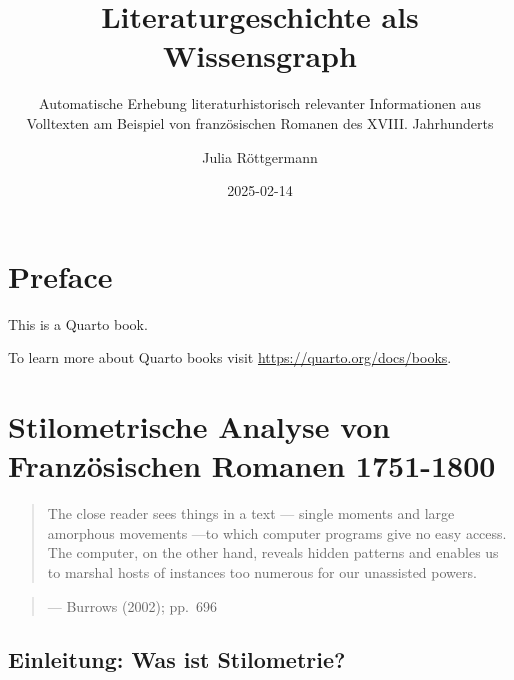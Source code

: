 \documentclass[
  12pt,
  letterpaper,
]{classicthesis}
\title{Literaturgeschichte als Wissensgraph}
\subtitle{Automatische Erhebung literaturhistorisch relevanter
Informationen aus Volltexten am Beispiel von französischen Romanen des
XVIII. Jahrhunderts}
\author{Julia Röttgermann}
\date{2025-02-14}
\renewcommand*\contentsname{Table of contents}
\newcommand\contentsname{Table of contents}
\begin{document}
\maketitle

\renewcommand*\contentsname{Table of contents}
{
\hypersetup{linkcolor=}
\setcounter{tocdepth}{2}
\tableofcontents
}


\chapter*{Preface}\label{preface}


This is a Quarto book.

To learn more about Quarto books visit
\url{https://quarto.org/docs/books}.


\chapter{\texorpdfstring{\textbf{Stilometrische Analyse von
Französischen Romanen
1751-1800}}{Stilometrische Analyse von Französischen Romanen 1751-1800}}\label{stilometrische-analyse-von-franzuxf6sischen-romanen-1751-1800}

\begin{quote}
The close reader sees things in a text --- single moments and large
amorphous movements ---to which computer programs give no easy access.
The computer, on the other hand, reveals hidden patterns and enables us
to marshal hosts of instances too numerous for our unassisted powers.
\end{quote}

\begin{quote}
--- Burrows (2002); pp.~696
\end{quote}

\section{Einleitung: Was ist
Stilometrie?}\label{einleitung-was-ist-stilometrie}
\end{document}
